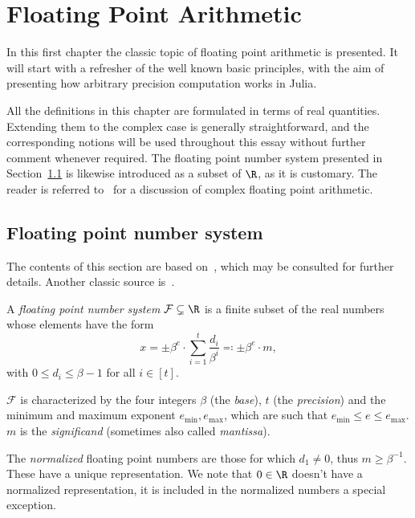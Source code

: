 \chapter{Floating Point Arithmetic}\label{capitolo:1}
In this first chapter the classic topic of floating point arithmetic is presented. It will start with a refresher of the well known basic principles, with the aim of presenting how arbitrary precision computation works in Julia.  

All the definitions in this chapter are formulated in terms of real quantities. Extending them to the complex case is generally straightforward, and the corresponding notions will be used throughout this essay without further comment whenever required.
The floating point number system presented in Section~\ref{sect:floatingpoint} is likewise introduced as a subset of $\R$, as it is customary. The reader is referred to~\cite[§~3.6]{higham:accuracy_book} for a discussion of complex floating point arithmetic.

\section{Floating point number system}\label{sect:floatingpoint}
The contents of this section are based on~\cite[§~2]{higham:accuracy_book}, which may be consulted for further details. Another classic source is~\cite{goldberg:floating_pt_arithm}.

\begin{definizione}\label{def:float_pt_n_sys}
	A \emph{floating point number system} $\mathcal{F}\subsetneq\R$ is a finite subset of the real numbers whose elements have the form 
	\begin{equation}\label{eqn:float_pt_number}
		x = \pm\beta^e\cdot\sum_{i=1}^{t}\frac{d_i}{\beta^{i}}\eqcolon\pm\beta^e\cdot m,
	\end{equation}
	with $0\le d_i\le\beta-1$ for all $i\in[t]$.
\end{definizione}

$\mathcal{F}$ is characterized by the four integers $\beta$ (the \emph{base}), $t$ (the \emph{precision}) and the minimum and maximum exponent $e_{\min}, e_{\max}$, which are such that $e_{\min}\le e\le e_{\max}$.
$m$ is the \emph{significand} (sometimes also called \emph{mantissa}). 

The \emph{normalized} floating point numbers are those for which $d_1\ne 0$, thus $m\ge\beta^{-1}$. These have a unique representation. We note that $0\in\R$ doesn't have a normalized representation, it is included in the normalized numbers a special exception. 

